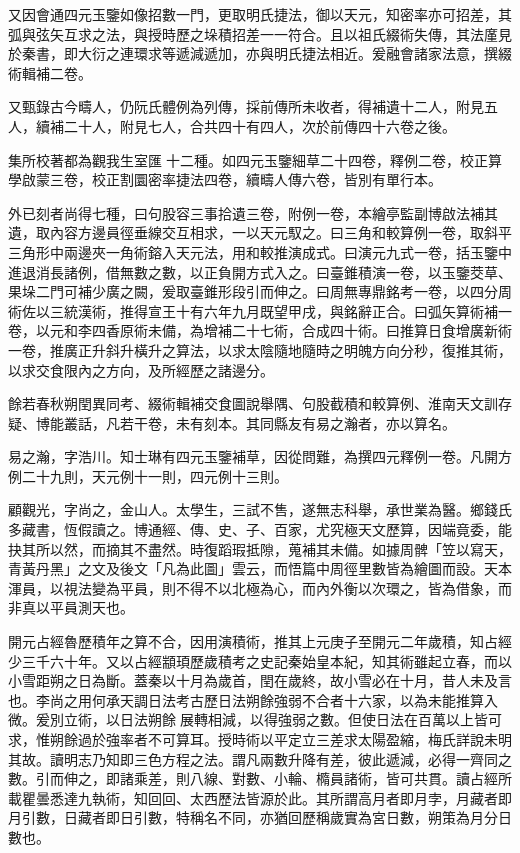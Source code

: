 \begin{pinyinscope}
又因會通四元玉鑒如像招數一門，更取明氏捷法，御以天元，知密率亦可招差，其弧與弦矢互求之法，與授時歷之垛積招差一一符合。且以祖氏綴術失傳，其法廑見於秦書，即大衍之連環求等遞減遞加，亦與明氏捷法相近。爰融會諸家法意，撰綴術輯補二卷。

又甄錄古今疇人，仍阮氏體例為列傳，採前傳所未收者，得補遺十二人，附見五人，續補二十人，附見七人，合共四十有四人，次於前傳四十六卷之後。

集所校著都為觀我生室匯十二種。如四元玉鑒細草二十四卷，釋例二卷，校正算學啟蒙三卷，校正割圜密率捷法四卷，續疇人傳六卷，皆別有單行本。

外已刻者尚得七種，曰句股容三事拾遺三卷，附例一卷，本繪亭監副博啟法補其遺，取內容方邊員徑垂線交互相求，一以天元馭之。曰三角和較算例一卷，取斜平三角形中兩邊夾一角術鎔入天元法，用和較推演成式。曰演元九式一卷，括玉鑒中進退消長諸例，借無數之數，以正負開方式入之。曰臺錐積演一卷，以玉鑒茭草、果垛二門可補少廣之闕，爰取臺錐形段引而伸之。曰周無專鼎銘考一卷，以四分周術佐以三統漢術，推得宣王十有六年九月既望甲戌，與銘辭正合。曰弧矢算術補一卷，以元和李四香原術未備，為增補二十七術，合成四十術。曰推算日食增廣新術一卷，推廣正升斜升橫升之算法，以求太陰隨地隨時之明魄方向分秒，復推其術，以求交食限內之方向，及所經歷之諸邊分。

餘若春秋朔閏異同考、綴術輯補交食圖說舉隅、句股截積和較算例、淮南天文訓存疑、博能叢話，凡若干卷，未有刻本。其同縣友有易之瀚者，亦以算名。

易之瀚，字浩川。知士琳有四元玉鑒補草，因從問難，為撰四元釋例一卷。凡開方例二十九則，天元例十一則，四元例十三則。

顧觀光，字尚之，金山人。太學生，三試不售，遂無志科舉，承世業為醫。鄉錢氏多藏書，恆假讀之。博通經、傳、史、子、百家，尤究極天文歷算，因端竟委，能抉其所以然，而摘其不盡然。時復蹈瑕抵隙，蒐補其未備。如據周髀「笠以寫天，青黃丹黑」之文及後文「凡為此圖」雲云，而悟篇中周徑里數皆為繪圖而設。天本渾員，以視法變為平員，則不得不以北極為心，而內外衡以次環之，皆為借象，而非真以平員測天也。

開元占經魯歷積年之算不合，因用演積術，推其上元庚子至開元二年歲積，知占經少三千六十年。又以占經顓頊歷歲積考之史記秦始皇本紀，知其術雖起立春，而以小雪距朔之日為斷。蓋秦以十月為歲首，閏在歲終，故小雪必在十月，昔人未及言也。李尚之用何承天調日法考古歷日法朔餘強弱不合者十六家，以為未能推算入微。爰別立術，以日法朔餘展轉相減，以得強弱之數。但使日法在百萬以上皆可求，惟朔餘過於強率者不可算耳。授時術以平定立三差求太陽盈縮，梅氏詳說未明其故。讀明志乃知即三色方程之法。謂凡兩數升降有差，彼此遞減，必得一齊同之數。引而伸之，即諸乘差，則八線、對數、小輪、橢員諸術，皆可共貫。讀占經所載瞿曇悉達九執術，知回回、太西歷法皆源於此。其所謂高月者即月孛，月藏者即月引數，日藏者即日引數，特稱名不同，亦猶回歷稱歲實為宮日數，朔策為月分日數也。


\end{pinyinscope}

